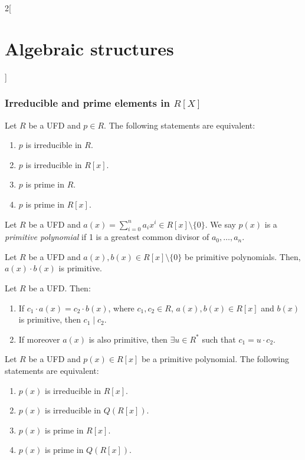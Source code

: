\documentclass[../../../main.tex]{subfiles}
\begin{document}
\begin{multicols}{2}[\section{Algebraic structures}]
  \subsubsection{Irreducible and prime elements in $R[X]$}
  \begin{prop}
    Let $R$ be a UFD and $p\in R$. The following statements are equivalent:
    \begin{enumerate}
      \item $p$ is irreducible in $R$.
      \item $p$ is irreducible in $R[x]$.
      \item $p$ is prime in $R$.
      \item $p$ is prime in $R[x]$.
    \end{enumerate}
  \end{prop}
  \begin{definition}
    Let $R$ be a UFD and $a(x)=\sum_{i=0}^na_ix^i\in R[x]\setminus\{0\}$. We say $p(x)$ is a \textit{primitive polynomial} if 1 is a greatest common divisor of $a_0,\ldots,a_n$.
  \end{definition}
  \begin{lemma}
    Let $R$ be a UFD and $a(x),b(x)\in R[x]\setminus\{0\}$ be primitive polynomials. Then, $a(x)\cdot b(x)$ is primitive.
  \end{lemma}
  \begin{lemma}
    Let $R$ be a UFD. Then:
    \begin{enumerate}
      \item If $c_1\cdot a(x)=c_2\cdot b(x)$, where $c_1,c_2\in R$, $a(x),b(x)\in R[x]$ and $b(x)$ is primitive, then $c_1\mid c_2$.
      \item If moreover $a(x)$ is also primitive, then $\exists u\in R^*$ such that $c_1=u\cdot c_2$.
    \end{enumerate}
  \end{lemma}
  \begin{prop}
    Let $R$ be a UFD and $p(x)\in R[x]$ be a primitive polynomial. The following statements are equivalent:
    \begin{enumerate}
      \item $p(x)$ is irreducible in $R[x]$.
      \item $p(x)$ is irreducible in $Q(R[x])$.
      \item $p(x)$ is prime in $R[x]$.
      \item $p(x)$ is prime in $Q(R[x])$.
    \end{enumerate}
  \end{prop}

\end{multicols}
\end{document}
